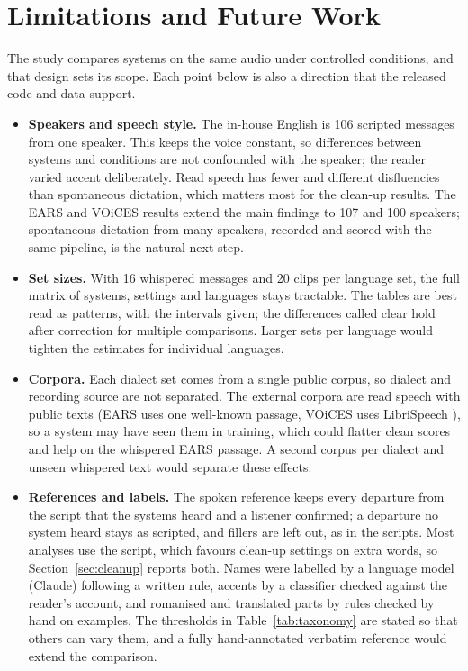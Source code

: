 \documentclass[11pt]{article}
\begin{document}
\section{Limitations and Future Work}\label{sec:limits}
The study compares systems on the same audio under controlled conditions, and that design sets its scope. Each point below is also a direction that the released code and data support.
\begin{itemize}\itemsep1pt
  \item \textbf{Speakers and speech style.} The in-house English is 106 scripted messages from one speaker. This keeps the voice constant, so differences between systems and conditions are not confounded with the speaker; the reader varied accent deliberately. Read speech has fewer and different disfluencies than spontaneous dictation, which matters most for the clean-up results. The EARS and VOiCES results extend the main findings to 107 and 100 speakers; spontaneous dictation from many speakers, recorded and scored with the same pipeline, is the natural next step.
  \item \textbf{Set sizes.} With 16 whispered messages and 20 clips per language set, the full matrix of systems, settings and languages stays tractable. The tables are best read as patterns, with the intervals given; the differences called clear hold after correction for multiple comparisons. Larger sets per language would tighten the estimates for individual languages.
  \item \textbf{Corpora.} Each dialect set comes from a single public corpus, so dialect and recording source are not separated. The external corpora are read speech with public texts (EARS uses one well-known passage, VOiCES uses LibriSpeech \citep{panayotov2015librispeech}), so a system may have seen them in training, which could flatter clean scores and help on the whispered EARS passage. A second corpus per dialect and unseen whispered text would separate these effects.
  \item \textbf{References and labels.} The spoken reference keeps every departure from the script that the systems heard and a listener confirmed; a departure no system heard stays as scripted, and fillers are left out, as in the scripts. Most analyses use the script, which favours clean-up settings on extra words, so Section~\ref{sec:cleanup} reports both. Names were labelled by a language model (Claude) following a written rule, accents by a classifier checked against the reader's account, and romanised and translated parts by rules checked by hand on examples. The thresholds in Table~\ref{tab:taxonomy} are stated so that others can vary them, and a fully hand-annotated verbatim reference would extend the comparison.

\end{itemize}
\end{document}
